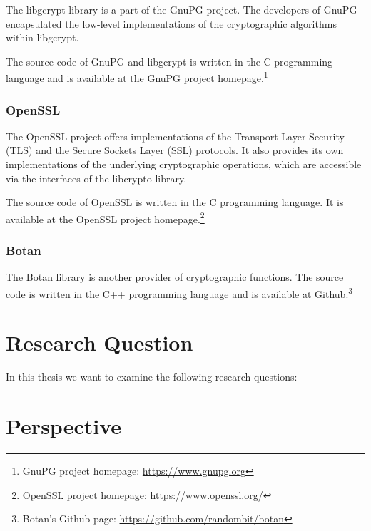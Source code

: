 The libgcrypt library is a part of the GnuPG project.
The developers of GnuPG encapsulated the low-level implementations of the cryptographic algorithms within libgcrypt.

The source code of GnuPG and libgcrypt is written in the C programming language and is available at the GnuPG project homepage.\footnote{GnuPG project homepage: \url{https://www.gnupg.org}}

  \subsubsection{OpenSSL}

The OpenSSL project offers implementations of the Transport Layer Security (TLS) and the Secure Sockets Layer (SSL) protocols.
It also provides its own implementations of the underlying cryptographic operations, which are accessible via the interfaces of the libcrypto library.

The source code of OpenSSL is written in the C programming language.
It is available at the OpenSSL project homepage.\footnote{OpenSSL project homepage: \url{https://www.openssl.org/}}

  \subsubsection{Botan}

The Botan library is another provider of cryptographic functions.
The source code is written in the C++ programming language and is available at Github.\footnote{Botan's Github page: \url{https://github.com/randombit/botan}}

\section{Research Question}
\label{researchq}

In this thesis we want to examine the following research questions:


\section{Perspective}

